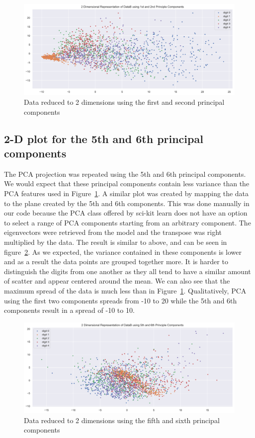 \begin{figure}[htb]
 \centering
\includegraphics[width=\textwidth]{assignment1/2-2-dimreduction_pca1_2.png}
\caption{\label{fig:fig3}Data reduced to 2 dimensions using the first and second principal components}
\end{figure}


\clearpage{}
\subsection{2-D plot for the 5th and 6th principal components}

The PCA projection was repeated using the 5th and 6th principal components. We would expect that these principal components contain less variance than the PCA features used in Figure~\ref{fig:fig3}. A similar plot was created by mapping the data to the plane created by the 5th and 6th components. This was done manually in our code because the PCA class offered by sci-kit learn does not have an option to select a range of PCA components starting from an arbitrary component. The eigenvectors were retrieved from the model and the transpose was right multiplied by the data. The result is similar to above, and can be seen in figure~\ref{fig:fig4}. As we expected, the variance contained in these components is lower and as a result the data points are grouped together more. It is harder to distinguish the digits from one another as they all tend to have a similar amount of scatter and appear centered around the mean. We can also see that the maximum spread of the data is much less than in Figure~\ref{fig:fig3}. Qualitatively, PCA using the first two components spreads from -10 to 20 while the 5th and 6th components result in a spread of -10 to 10.

\begin{figure}[htb]
 \centering
\includegraphics[width=\textwidth]{assignment1/2-3-dimreduction_pca5_6.png}
\caption{\label{fig:fig4}Data reduced to 2 dimensions using the fifth and sixth principal components}
\end{figure}



